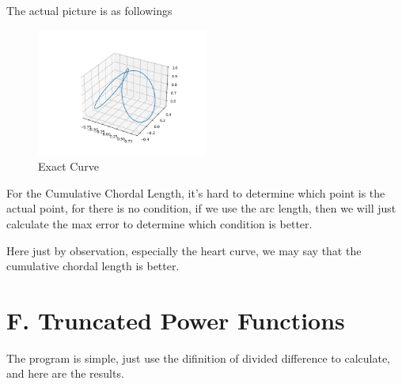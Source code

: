 \documentclass[a4paper]{article}
\begin{document}
The actual picture is as followings
\begin{figure}[H]
    \centering
    \includegraphics[width=0.5\textwidth]{../figure/EXACT160.png}
    \caption{Exact Curve}
\end{figure}

For the Cumulative Chordal Length, it's hard to determine which point is the actual point, for there is no condition, 
if we use the arc length, then we will just calculate the max error to determine which condition is better. 

Here just by observation, especially the heart curve, we may say that the cumulative chordal length is better.

\section{F. Truncated Power Functions}

The program is simple, just use the difinition of divided difference to calculate, and here are the results. 
\end{document}
